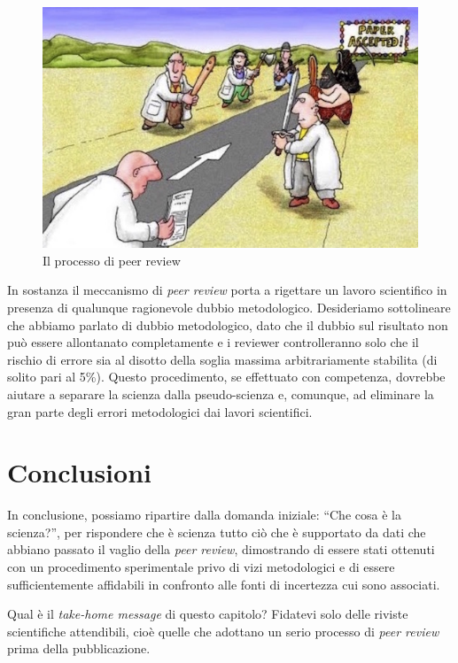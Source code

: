 \documentclass[a4paper,12pt,oneside]{book}
\begin{document}
\begin{figure}

{\centering \includegraphics[width=0.75\linewidth]{_images/PeerReview} 

}

\caption{Il processo di peer review}\label{fig:figName3}
\end{figure}

In sostanza il meccanismo di \emph{peer review} porta a rigettare un lavoro scientifico in presenza di qualunque ragionevole dubbio metodologico. Desideriamo sottolineare che abbiamo parlato di dubbio metodologico, dato che il dubbio sul risultato non può essere allontanato completamente e i reviewer controlleranno solo che il rischio di errore sia al disotto della soglia massima arbitrariamente stabilita (di solito pari al 5\%). Questo procedimento, se effettuato con competenza, dovrebbe aiutare a separare la scienza dalla pseudo-scienza e, comunque, ad eliminare la gran parte degli errori metodologici dai lavori scientifici.

\hypertarget{conclusioni}{%
\section{Conclusioni}\label{conclusioni}}

In conclusione, possiamo ripartire dalla domanda iniziale: ``Che cosa è la scienza?'', per rispondere che è scienza tutto ciò che è supportato da dati che abbiano passato il vaglio della \emph{peer review}, dimostrando di essere stati ottenuti con un procedimento sperimentale privo di vizi metodologici e di essere sufficientemente affidabili in confronto alle fonti di incertezza cui sono associati.

Qual è il \emph{take-home message} di questo capitolo? Fidatevi solo delle riviste scientifiche attendibili, cioè quelle che adottano un serio processo di \emph{peer review} prima della pubblicazione.
\end{document}
